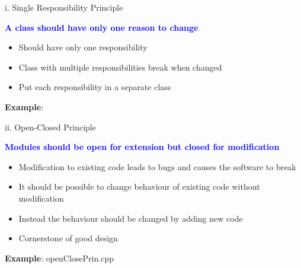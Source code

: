 \documentclass[13pt]{beamer}
\begin{document}
\begin{frame}{i. Single Responsibility Principle}
	\begin{center}
		\textcolor{blue}{\textbf{A class should have only one reason to change}}
	\end{center}
	\begin{itemize}
		\item Should have only one responsibility
		\item Class with multiple responsibilities break when changed
		\item Put each responsibility in a separate class
	\end{itemize}
	\textbf{Example}:                                        
	\begin{center}
	\end{center}
\end{frame}

\begin{frame}{ii. Open-Closed Principle}
	\begin{center}
		\textcolor{blue}{\textbf{Modules should be open for extension but closed 				for 	modification}}
	\end{center}
	
	\begin{itemize}
		\setlength\itemsep{1em} 
		\item Modification to existing code leads to bugs and causes the software to break
		\item It should be possible to change behaviour of existing code without modification
		\item Instead the behaviour should be changed by adding new code
		\item Cornerstone of good design
	\end{itemize}            
	\textbf{Example}: openClosePrin.cpp
\end{frame}
\end{document}
